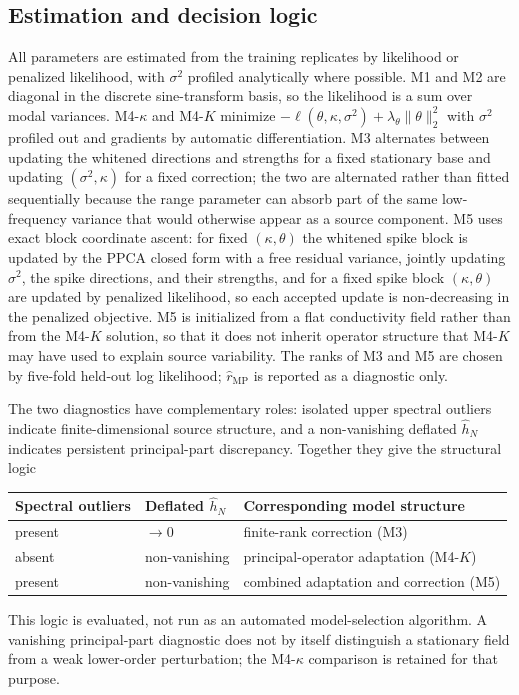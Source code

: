 \documentclass[11pt]{article}
\numberwithin{table}{section}
\numberwithin{figure}{section}
\begin{document}
\subsection{Estimation and decision logic}
\label{sec:fitting}
\label{sec:decision_logic}

All parameters are estimated from the training replicates by likelihood or penalized likelihood, with $\sigma^2$ profiled analytically where possible. M1 and M2 are diagonal in the discrete sine-transform basis, so the likelihood is a sum over modal variances. M4-$\kappa$ and M4-$K$ minimize $-\ell(\theta,\kappa,\sigma^2)+\lambda_\theta\|\theta\|_2^2$ with $\sigma^2$ profiled out and gradients by automatic differentiation. M3 alternates between updating the whitened directions and strengths for a fixed stationary base and updating $(\sigma^2,\kappa)$ for a fixed correction; the two are alternated rather than fitted sequentially because the range parameter can absorb part of the same low-frequency variance that would otherwise appear as a source component. M5 uses exact block coordinate ascent: for fixed $(\kappa,\theta)$ the whitened spike block is updated by the PPCA closed form with a free residual variance, jointly updating $\sigma^2$, the spike directions, and their strengths, and for a fixed spike block $(\kappa,\theta)$ are updated by penalized likelihood, so each accepted update is non-decreasing in the penalized objective. M5 is initialized from a flat conductivity field rather than from the M4-$K$ solution, so that it does not inherit operator structure that M4-$K$ may have used to explain source variability. The ranks of M3 and M5 are chosen by five-fold held-out log likelihood; $\widehat r_{\mathrm{MP}}$ is reported as a diagnostic only.

The two diagnostics have complementary roles: isolated upper spectral outliers indicate finite-dimensional source structure, and a non-vanishing deflated $\widehat h_N$ indicates persistent principal-part discrepancy. Together they give the structural logic
\begin{center}
\begin{tabular}{lll}
\hline
Spectral outliers & Deflated $\widehat h_N$ & Corresponding model structure\\
\hline
present & $\to0$ & finite-rank correction (M3)\\
absent & non-vanishing & principal-operator adaptation (M4-$K$)\\
present & non-vanishing & combined adaptation and correction (M5)\\
\hline
\end{tabular}
\end{center}
This logic is evaluated, not run as an automated model-selection algorithm. A vanishing principal-part diagnostic does not by itself distinguish a stationary field from a weak lower-order perturbation; the M4-$\kappa$ comparison is retained for that purpose.
\end{document}
